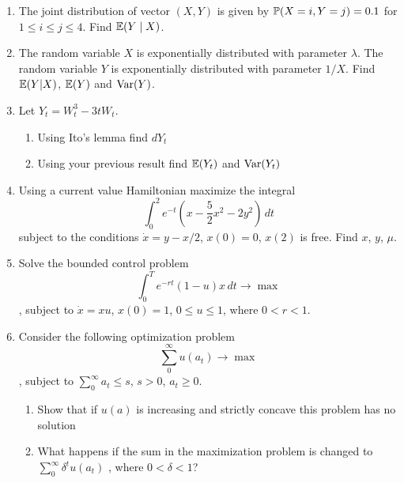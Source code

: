 \documentclass[12pt, a4paper]{article}
\begin{document}
\begin{enumerate}
\item The joint distribution of vector $(X,Y)$ is given by $\P(X=i,Y=j)=0.1$  for $1\leq i\leq j\leq 4$. Find $\E(Y\mid X)$.
\item The random variable $X$ is exponentially distributed with parameter $\lambda$. The random variable $Y$ is exponentially distributed with parameter $1/X$. Find $\E(Y|X)$, $\E(Y)$  and $\Var(Y)$.
\item Let $Y_t=W_t^3-3tW_t$.
\begin{enumerate}
\item Using Ito’s lemma find $dY_t$
\item Using your previous result find $\E(Y_t)$ and $\Var(Y_t)$
\end{enumerate}

\item Using a current value Hamiltonian maximize the integral
\[
\int_0^2 e^{-t}\left(x-\frac{5}{2}x^2-2y^2\right)\, dt
\]
subject to the conditions $\dot{x}=y-x/2$, $x(0)=0$, $x(2)$ is free. Find $x$, $y$, $\mu$.
\item Solve the bounded control problem
\[
\int_0^T e^{-rt}(1-u)x\, dt \to \max
\]
, subject to $\dot{x}=xu$, $x(0)=1$, $0\leq u\leq 1$, where $0<r<1$.
\item Consider the following optimization problem
\[
\sum_0^{\infty} u(a_t) \to \max
\]
, subject to $\sum_0^{\infty}a_t \leq s$, $s>0$, $a_t \geq 0$.
\begin{enumerate}
\item Show that if $u(a)$ is increasing and strictly concave this problem has no solution
\item What happens if the sum in the maximization problem is changed to $\sum_0^{\infty} \delta^t u(a_t)$ , where $0<\delta<1$?
\end{enumerate}


\end{enumerate}
\end{document}
